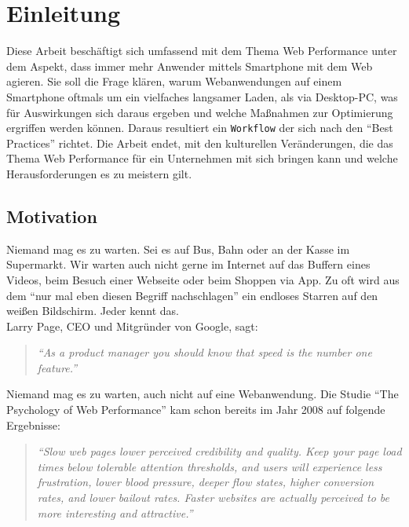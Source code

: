 \setcounter{page}{1}

\section{Einleitung} %
\label{sec:einleitung}
	Diese Arbeit beschäftigt sich umfassend mit dem Thema Web Performance unter dem Aspekt, dass immer mehr Anwender mittels Smartphone mit dem Web agieren. Sie soll die Frage klären, warum Webanwendungen auf einem Smartphone oftmals um ein vielfaches langsamer Laden, als via Desktop-PC, was für Auswirkungen sich daraus ergeben und welche Maßnahmen zur Optimierung ergriffen werden können. Daraus resultiert ein \texttt{Workflow} der sich nach den "`Best Practices"' richtet. Die Arbeit endet, mit den kulturellen Veränderungen, die das Thema Web Performance für ein Unternehmen mit sich bringen kann und welche Herausforderungen es zu meistern gilt.

	\subsection{Motivation} %
	\label{sub:motivation}

		Niemand mag es zu warten. Sei es auf Bus, Bahn oder an der Kasse im Supermarkt. Wir warten auch nicht gerne im Internet auf das Buffern eines Videos, beim Besuch einer Webseite oder beim Shoppen via App. Zu oft wird aus dem "`nur mal eben diesen Begriff nachschlagen"' ein endloses Starren auf den weißen Bildschirm. Jeder kennt das.\\

		Larry Page, CEO und Mitgründer von Google, sagt:
		\begin{quote}
			\textit{"`As a product manager you should know that speed is the number one feature."'}\autocite{holzle10}
		\end{quote}
		Niemand mag es zu warten, auch nicht auf eine Webanwendung. Die Studie "`The Psychology of Web Performance"' kam schon bereits im Jahr 2008 auf folgende Ergebnisse:

		\begin{quote}\itshape
			"`Slow web pages lower perceived credibility and quality. Keep your page load times below tolerable attention thresholds, and users will experience less frustration, lower blood pressure, deeper flow states, higher conversion rates, and lower bailout rates. Faster websites are actually perceived to be more interesting and attractive."' \autocite{webOpti08}
		\end{quote}

